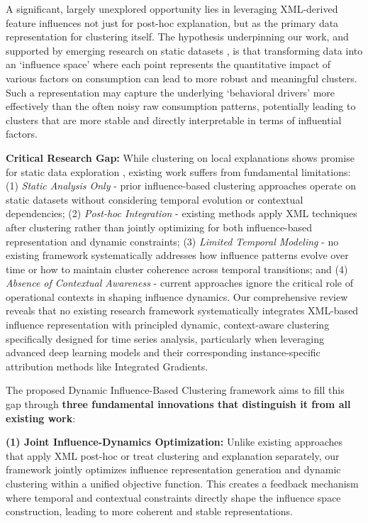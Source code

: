 \documentclass[final,authoryear,3p,times,review,sort&compress]{elsarticle}
\begin{document}
A significant, largely unexplored opportunity lies in leveraging XML-derived feature influences not just for post-hoc explanation, but as the primary data representation for clustering itself. The hypothesis underpinning our work, and supported by emerging research on static datasets \citep{escriva2025effective}, is that transforming data into an `influence space' where each point represents the quantitative impact of various factors on consumption can lead to more robust and meaningful clusters. Such a representation may capture the underlying `behavioral drivers' more effectively than the often noisy raw consumption patterns, potentially leading to clusters that are more stable and directly interpretable in terms of influential factors. 

\textbf{Critical Research Gap:} While clustering on local explanations shows promise for static data exploration \citep{escriva2025effective}, existing work suffers from fundamental limitations: (1) \textit{Static Analysis Only} - prior influence-based clustering approaches operate on static datasets without considering temporal evolution or contextual dependencies; (2) \textit{Post-hoc Integration} - existing methods apply XML techniques after clustering rather than jointly optimizing for both influence-based representation and dynamic constraints; (3) \textit{Limited Temporal Modeling} - no existing framework systematically addresses how influence patterns evolve over time or how to maintain cluster coherence across temporal transitions; and (4) \textit{Absence of Contextual Awareness} - current approaches ignore the critical role of operational contexts in shaping influence dynamics. Our comprehensive review reveals that no existing research framework systematically integrates XML-based influence representation with principled dynamic, context-aware clustering specifically designed for time series analysis, particularly when leveraging advanced deep learning models and their corresponding instance-specific attribution methods like Integrated Gradients.

The proposed Dynamic Influence-Based Clustering framework aims to fill this gap through \textbf{three fundamental innovations that distinguish it from all existing work}: 

\textbf{(1) Joint Influence-Dynamics Optimization:} Unlike existing approaches that apply XML post-hoc or treat clustering and explanation separately, our framework jointly optimizes influence representation generation and dynamic clustering within a unified objective function. This creates a feedback mechanism where temporal and contextual constraints directly shape the influence space construction, leading to more coherent and stable representations.
\end{document}
